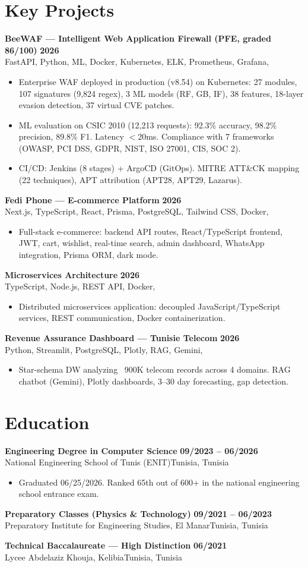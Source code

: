 \documentclass[a4paper,9pt]{article}
\newcommand{\cventry}[4]{\textbf{#1} \hfill \textbf{#4}\\[0.2pt]#2{\ifx\relax#3\relax\else, #3\fi}\par\vspace{0.3pt}}
\begin{document}
\section{Key Projects}
\cventry{BeeWAF --- Intelligent Web Application Firewall (PFE, graded 86/100)}{FastAPI, Python, ML, Docker, Kubernetes, ELK, Prometheus, Grafana}{}{2026}
\begin{itemize}
  \item Enterprise WAF deployed in production (v8.54) on Kubernetes: 27 modules, 107 signatures (9,824 regex), 3 ML models (RF, GB, IF), 38 features, 18-layer evasion detection, 37 virtual CVE patches.
  \item ML evaluation on CSIC 2010 (12,213 requests): 92.3\% accuracy, 98.2\% precision, 89.8\% F1. Latency $<$20ms. Compliance with 7 frameworks (OWASP, PCI DSS, GDPR, NIST, ISO 27001, CIS, SOC 2).
  \item CI/CD: Jenkins (8 stages) + ArgoCD (GitOps). MITRE ATT\&CK mapping (22 techniques), APT attribution (APT28, APT29, Lazarus).
\end{itemize}
\cventry{Fedi Phone --- E-commerce Platform}{Next.js, TypeScript, React, Prisma, PostgreSQL, Tailwind CSS, Docker}{}{2026}
\begin{itemize}
  \item Full-stack e-commerce: backend API routes, React/TypeScript frontend, JWT, cart, wishlist, real-time search, admin dashboard, WhatsApp integration, Prisma ORM, dark mode.
\end{itemize}
\cventry{Microservices Architecture}{TypeScript, Node.js, REST API, Docker}{}{2026}
\begin{itemize}
  \item Distributed microservices application: decoupled JavaScript/TypeScript services, REST communication, Docker containerization.
\end{itemize}
\cventry{Revenue Assurance Dashboard --- Tunisie Telecom}{Python, Streamlit, PostgreSQL, Plotly, RAG, Gemini}{}{2026}
\begin{itemize}
  \item Star-schema DW analyzing ~900K telecom records across 4 domains. RAG chatbot (Gemini), Plotly dashboards, 3--30 day forecasting, gap detection.
\end{itemize}
\section{Education}
\cventry{Engineering Degree in Computer Science}{National Engineering School of Tunis (ENIT)}{Tunisia}{09/2023 -- 06/2026}
\begin{itemize}
  \item Graduated 06/25/2026. Ranked 65th out of 600+ in the national engineering school entrance exam.
\end{itemize}
\cventry{Preparatory Classes (Physics \& Technology)}{Preparatory Institute for Engineering Studies, El Manar}{Tunisia}{09/2021 -- 06/2023}
\cventry{Technical Baccalaureate --- High Distinction}{Lycee Abdelaziz Khouja, Kelibia}{Tunisia}{06/2021}
\end{document}
